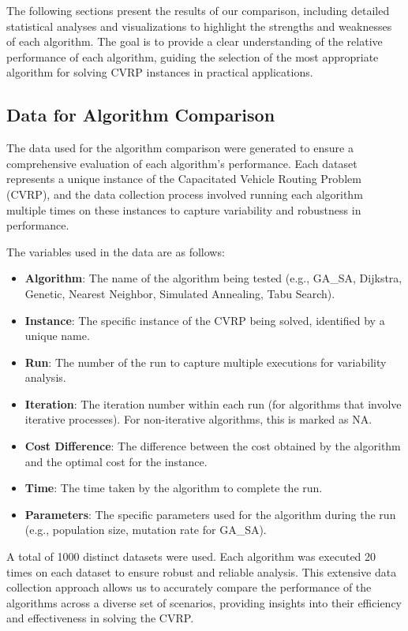 \documentclass[
]{article}
\begin{document}
    The following sections present the results of our comparison, including detailed statistical analyses and visualizations to highlight the strengths and weaknesses of each algorithm. The goal is to provide a clear understanding of the relative performance of each algorithm, guiding the selection of the most appropriate algorithm for solving CVRP instances in practical applications.

    \subsection{Data for Algorithm Comparison}

    The data used for the algorithm comparison were generated to ensure a comprehensive evaluation of each algorithm's performance. Each dataset represents a unique instance of the Capacitated Vehicle Routing Problem (CVRP), and the data collection process involved running each algorithm multiple times on these instances to capture variability and robustness in performance.

    The variables used in the data are as follows:

    \begin{itemize}
        \item \textbf{Algorithm}: The name of the algorithm being tested (e.g., GA\_SA, Dijkstra, Genetic, Nearest Neighbor, Simulated Annealing, Tabu Search).
        \item \textbf{Instance}: The specific instance of the CVRP being solved, identified by a unique name.
        \item \textbf{Run}: The number of the run to capture multiple executions for variability analysis.
        \item \textbf{Iteration}: The iteration number within each run (for algorithms that involve iterative processes). For non-iterative algorithms, this is marked as NA.
        \item \textbf{Cost Difference}: The difference between the cost obtained by the algorithm and the optimal cost for the instance.
        \item \textbf{Time}: The time taken by the algorithm to complete the run.
        \item \textbf{Parameters}: The specific parameters used for the algorithm during the run (e.g., population size, mutation rate for GA\_SA).
    \end{itemize}

    A total of 1000 distinct datasets were used.
    Each algorithm was executed 20 times on each dataset to ensure robust and reliable analysis. This extensive data collection approach allows us to accurately compare the performance of the algorithms across a diverse set of scenarios, providing insights into their efficiency and effectiveness in solving the CVRP.
\end{document}
